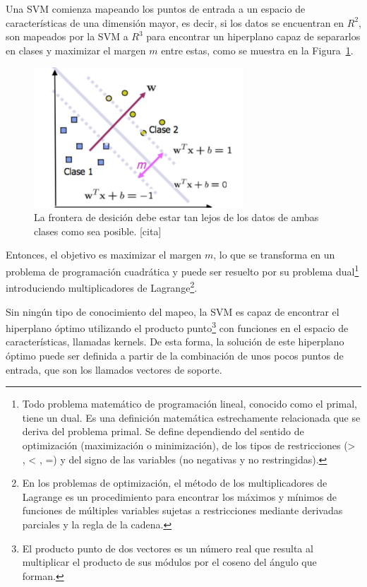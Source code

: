 \begin{enumerate}
\begin{description}
      Una SVM comienza mapeando los puntos de entrada a un espacio de características de una dimensión mayor, es decir, si los datos se encuentran en $R^2$, son mapeados por la SVM a $R^3$ para encontrar un hiperplano capaz de separarlos en clases y maximizar el margen $m$ entre estas, como se muestra en la Figura~\ref{fig:svm}.
      
      \begin{figure}[H]
        \centering
        \includegraphics[width=0.7\textwidth]{Figuras/SVM}
         \caption{La frontera de desición debe estar tan lejos de los datos de ambas clases como sea posible. [cita]}
         \label{fig:svm}
      \end{figure}
      
      Entonces, el objetivo es maximizar el margen $m$, lo que se transforma en un problema de programación cuadrática y puede ser resuelto por su problema dual\footnote{Todo problema matemático de programación lineal, conocido como el primal, tiene un dual. Es una definición matemática estrechamente relacionada que se deriva del problema primal. Se define dependiendo del sentido de optimización (maximización o minimización), de los tipos de restricciones (> , < , =) y del signo de las variables (no negativas y no restringidas).} introduciendo multiplicadores de Lagrange\footnote{En los problemas de optimización, el método de los multiplicadores de Lagrange es un procedimiento para encontrar los máximos y mínimos de funciones de múltiples variables sujetas a restricciones mediante derivadas parciales y la regla de la cadena.}. 
      
      Sin ningún tipo de conocimiento del mapeo, la SVM es capaz de encontrar el hiperplano óptimo utilizando el producto punto\footnote{El producto punto de dos vectores es un número real que resulta al multiplicar el producto de sus módulos por el coseno del ángulo que forman.} con funciones en el espacio de características, llamadas kernels. De esta forma, la solución de este hiperplano óptimo puede ser definida a partir de la combinación de unos pocos puntos de entrada, que son los llamados vectores de soporte. 
      

\end{description}
\end{enumerate}
